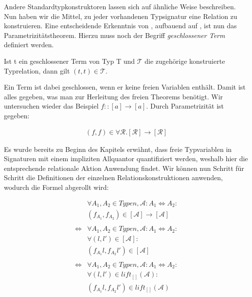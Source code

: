 Andere Standardtypkonstruktoren lassen sich auf ähnliche Weise beschreiben. Nun haben wir die Mittel, zu jeder vorhandenen
Typsignatur eine Relation zu konstruieren. Eine entscheidende Erkenntnis von \cite{wadler}, aufbauend auf
\cite{reynolds}, ist nun das Parametrizitätstheorem. Hierzu muss noch der Begriff \textit{geschlossener Term} definiert werden.

\begin{mytheorem}[Parametrizität]
Ist t ein geschlossener Term von Typ T und $\mathcal{T}$ die zugehörige konstruierte Typrelation, dann gilt $(t, t) \in \mathcal{T}$.
\end{mytheorem}

Ein Term ist dabei geschlossen, wenn er keine freien Variablen enthält.
Damit ist alles gegeben, was man zur Herleitung des freien Theorems benötigt. Wir untersuchen wieder das Beispiel
$f :: [a] \rightarrow [a]$. Durch Parametrizität ist gegeben:

\begin{align*}
(f, f) \in \forall \mathcal{R} . [\mathcal{R}] \rightarrow [\mathcal{R}]
\end{align*}

Es wurde bereits zu Beginn des Kapitels erwähnt, dass freie Typvariablen in Signaturen mit einem impliziten Allquantor
quantifiziert werden, weshalb hier die entsprechende relationale Aktion Anwendung findet.
Wir können nun Schritt für Schritt die Definitionen der einzelnen Relationskonstruktionen anwenden, wodurch die Formel
abgerollt wird:

\begin{align*}
&\forall A_1, A_2 \in Typen, \mathcal{A} : A_1 \Leftrightarrow A_2: \\
&(f_{A_1}, f_{A_2}) \in [\mathcal{A}] \rightarrow [\mathcal{A}] \\
& \\
\Leftrightarrow &
\forall A_1, A_2 \in Typen, \mathcal{A} : A_1 \Leftrightarrow A_2: \\
& \forall (l, l') \in [\mathcal{A}]: \\
&(f_{A_1} l, f_{A_2} l') \in [\mathcal{A}] \\
& \\
\Leftrightarrow &
\forall A_1, A_2 \in Typen, \mathcal{A} : A_1 \Leftrightarrow A_2: \\
& \forall (l, l') \in lift_{[]}(\mathcal{A}): \\
& (f_{A_1} l, f_{A_2} l') \in lift_{[]}(\mathcal{A}) \\
\end{align*}

